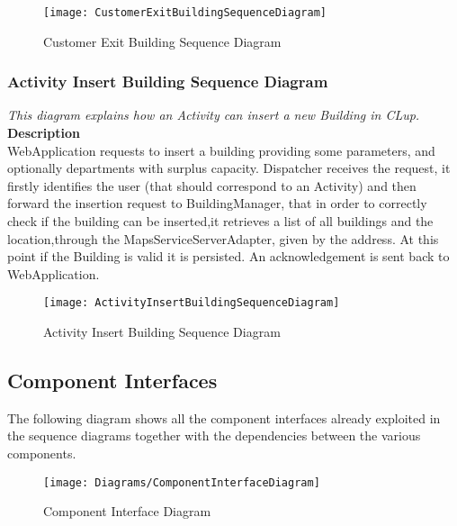 \begin{figure}[H]
 \centering
 \texttt{[image: CustomerExitBuildingSequenceDiagram]}
 \caption{ Customer Exit Building Sequence Diagram }
 \end{figure}

\newpage
\subsubsection{Activity Insert Building Sequence Diagram}
\textit{This diagram explains how an Activity can insert a new Building in CLup.\\}
\textbf{Description\\}
WebApplication requests to insert a building providing some parameters, and optionally departments with surplus capacity. Dispatcher receives the request, it firstly identifies the user (that should correspond to an Activity) and then forward the insertion request to BuildingManager, that in order to correctly check if the building can be inserted,it retrieves a list of all buildings and the location,through the MapsServiceServerAdapter, given by the address. At this point if the Building is valid it is persisted. An acknowledgement is sent back to WebApplication.\\

\begin{figure}[H]
 \centering
 \texttt{[image: ActivityInsertBuildingSequenceDiagram]}
 \caption{ Activity Insert Building Sequence Diagram }
 \end{figure}

\newpage
\subsection{Component Interfaces}
The following diagram shows all the component interfaces already exploited in the sequence diagrams together with the dependencies between the various components. 

\begin{figure}[H]
 \centering
 \texttt{[image: Diagrams/ComponentInterfaceDiagram]}
 \caption{ Component Interface Diagram }
 \end{figure}

\newpage
